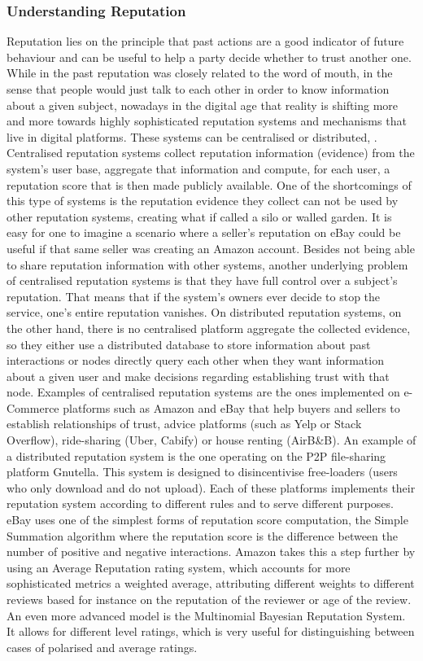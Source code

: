 \documentclass[llncsdoc]{llncs}
\begin{document}
\subsubsection{Understanding Reputation}
Reputation lies on the principle that past actions are a good indicator of future behaviour and can be useful to help a party decide whether to trust another one.
While in the past reputation was closely related to the word of mouth, in the sense that people would just talk to each other in order to know information about a given subject, nowadays in the digital age that reality is shifting more and more towards highly sophisticated reputation systems and mechanisms that live in digital platforms. These systems can be centralised or distributed, \cite{Anonymous:6b33pOF-}. Centralised reputation systems collect reputation information (evidence) from the system's user base, aggregate that information and compute, for each user, a reputation score that is then made publicly available. One of the shortcomings of this type of systems is the reputation evidence they collect can not be used by other reputation systems, creating what if called a silo or walled garden. It is easy for one to imagine a scenario where a seller's reputation on eBay could be useful if that same seller was creating an Amazon account. Besides not being able to share reputation information with other systems, another underlying problem of centralised reputation systems is that they have full control over a subject's reputation. That means that if the system's owners ever decide to stop the service, one's entire reputation vanishes.
On distributed reputation systems, on the other hand, there is no centralised platform aggregate the collected evidence, so they either use a distributed database to store information about past interactions or nodes directly query each other when they want information about a given user and make decisions regarding establishing trust with that node.
Examples of centralised reputation systems are the ones implemented on e-Commerce platforms such as Amazon and eBay that help buyers and sellers to establish relationships of trust, advice platforms (such as Yelp or Stack Overflow), ride-sharing (Uber, Cabify) or house renting (AirB\&B).
An example of a distributed reputation system is the one operating on the P2P file-sharing platform Gnutella. This system is designed to disincentivise free-loaders (users who only download and do not upload).
Each of these platforms implements their reputation system according to different rules and to serve different purposes. eBay uses one of the simplest forms of reputation score computation, the Simple Summation algorithm where the reputation score is the difference between the number of positive and negative interactions. Amazon takes this a step further by using an Average Reputation rating system, which accounts for more sophisticated metrics a weighted average, attributing different weights to different reviews based for instance on the reputation of the reviewer or age of the review.
An even more advanced model is the Multinomial Bayesian Reputation System. It allows for different level ratings, which is very useful for distinguishing between cases of polarised and average ratings.
\end{document}
